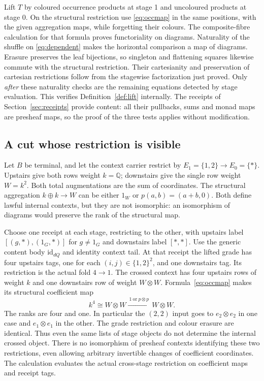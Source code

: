 \documentclass[11pt]{article}
\numberwithin{equation}{section}
\theoremstyle{definition}\newtheorem{definition}[theorem]{Definition}
\newcommand{\id}{\mathrm{id}}\newcommand{\op}{\mathrm{op}}\newcommand{\dom}{\mathrm{dom}}\newcommand{\cod}{\mathrm{cod}}
\begin{document}
Lift $T$ by coloured occurrence products at stage 1 and uncoloured
products at stage 0. On the structural restriction use
\eqref{eq:occmap} in the same positions, with the given aggregation
maps, while forgetting their colours. The composite-fibre calculation
for that formula proves functoriality on diagrams. Naturality of the
shuffle on \eqref{eq:dependent} makes the horizontal comparison a map
of diagrams. Erasure preserves the leaf bijections, so singleton and
flattening squares likewise commute with the structural restriction.
Their cartesianity and preservation of cartesian restrictions follow
from the stagewise factorization just proved. Only \emph{after} these
naturality checks are the remaining equations detected by stage
evaluation. This verifies Definition~\ref{def:lift} internally.
The receipts of Section~\ref{sec:receipts} provide content: all their
pullbacks, sums and monad maps are presheaf maps, so the proof of the
three tests applies without modification.

\subsection{A cut whose restriction is visible}
Let $B$ be terminal, and let the context carrier restrict by
$E_1=\{1,2\}\to E_0=\{*\}$. Upstairs give both rows weight $k=\mathbb Q$;
downstairs give the single row weight $W=k^2$. Both total augmentations
are the sum of coordinates. The structural aggregation $k\oplus k\to W$
can be either $1_W$ or $p(a,b)=(a+b,0)$. Both define lawful internal
contexts, but they are not isomorphic: an isomorphism of diagrams would
preserve the rank of the structural map.

Choose one receipt at each stage, restricting to the other, with upstairs
label $[(g,*),(1_G,*)]$ for $g\ne1_G$ and downstairs label $[*,*]$.
Use the generic content body $\id_{dQ}$ and identity context tail. At
that receipt the lifted grade has four upstairs tags, one for each
$(i,j)\in\{1,2\}^2$, and one downstairs tag. Its restriction is the
actual fold $4\to1$. The crossed context has four upstairs rows of
weight $k$ and one downstairs row of weight $W\otimes W$.
Formula~\eqref{eq:occmap} makes its structural coefficient map
\[
 k^4\cong W\otimes W
       \xrightarrow{\ 1\ \text{or}\ p\otimes p\ }W\otimes W.
\]
The ranks are four and one. In particular the $(2,2)$ input goes to
$e_2\otimes e_2$ in one case and $e_1\otimes e_1$ in the other.
The grade restriction and colour erasure are identical. Thus even the
same lists of stage objects do not determine the internal crossed object.
There is no isomorphism of presheaf contexts identifying these two
restrictions, even allowing arbitrary invertible changes of coefficient
coordinates. The calculation evaluates the actual cross-stage restriction
on coefficient maps and receipt tags.
\end{document}
